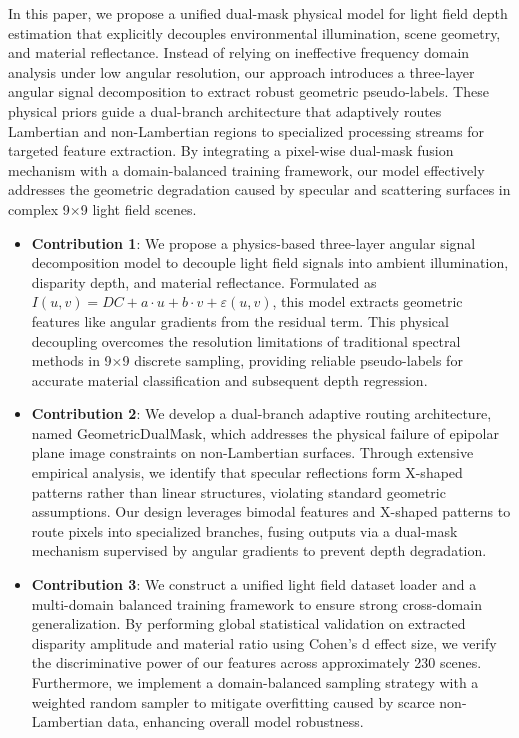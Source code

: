 \documentclass[lettersize,journal]{IEEEtran}
\begin{document}
In this paper, we propose a unified dual-mask physical model for light field depth estimation that explicitly decouples environmental illumination, scene geometry, and material reflectance. Instead of relying on ineffective frequency domain analysis under low angular resolution, our approach introduces a three-layer angular signal decomposition to extract robust geometric pseudo-labels. These physical priors guide a dual-branch architecture that adaptively routes Lambertian and non-Lambertian regions to specialized processing streams for targeted feature extraction. By integrating a pixel-wise dual-mask fusion mechanism with a domain-balanced training framework, our model effectively addresses the geometric degradation caused by specular and scattering surfaces in complex 9$\times$9 light field scenes.

\begin{itemize}
\item \textbf{Contribution 1}: We propose a physics-based three-layer angular signal decomposition model to decouple light field signals into ambient illumination, disparity depth, and material reflectance. Formulated as $I(u,v) = DC + a \cdot u + b \cdot v + \varepsilon(u,v)$, this model extracts geometric features like angular gradients from the residual term. This physical decoupling overcomes the resolution limitations of traditional spectral methods in 9$\times$9 discrete sampling, providing reliable pseudo-labels for accurate material classification and subsequent depth regression.

\item \textbf{Contribution 2}: We develop a dual-branch adaptive routing architecture, named GeometricDualMask, which addresses the physical failure of epipolar plane image constraints on non-Lambertian surfaces. Through extensive empirical analysis, we identify that specular reflections form X-shaped patterns rather than linear structures, violating standard geometric assumptions. Our design leverages bimodal features and X-shaped patterns to route pixels into specialized branches, fusing outputs via a dual-mask mechanism supervised by angular gradients to prevent depth degradation.

\item \textbf{Contribution 3}: We construct a unified light field dataset loader and a multi-domain balanced training framework to ensure strong cross-domain generalization. By performing global statistical validation on extracted disparity amplitude and material ratio using Cohen's d effect size, we verify the discriminative power of our features across approximately 230 scenes. Furthermore, we implement a domain-balanced sampling strategy with a weighted random sampler to mitigate overfitting caused by scarce non-Lambertian data, enhancing overall model robustness.
\end{itemize}
\end{document}
